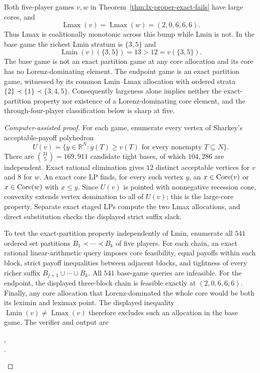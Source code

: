 \begin{proposition}
\label{prop:lx-five-large-core-separation}
Both five-player games $v,w$ in
Theorem~\ref{thm:lx-proper-exact-fails} have large cores, and
\[
 \operatorname{Lmax}(v)=\operatorname{Lmax}(w)=(2,0,6,6,6).
\]
Thus Lmax is coalitionally monotonic across this bump while Lmin is not.  In
the base game the richest Lmin stratum is $\{3,5\}$ and
\[
 \operatorname{Lmin}(v)(\{3,5\})=13>12=v(\{3,5\}).
\]
The base game is not an exact partition game at any core allocation and its
core has no Lorenz-dominating element.  The endpoint game is an exact partition
game, witnessed by its common Lmin--Lmax allocation with ordered strata
$\{2\}\prec\{1\}\prec\{3,4,5\}$.  Consequently largeness alone implies
neither the exact-partition property nor existence of a Lorenz-dominating core
element, and the through-four-player classification below is sharp at five.
\end{proposition}

\begin{proof}[Computer-assisted proof]
For each game, enumerate every vertex of Sharkey's acceptable-payoff
polyhedron
\[
 U(v)=\{y\in\mathbb R^N:y(T)\geq v(T)\text{ for every nonempty }T\subseteq N\}.
\]
There are $\binom{31}{5}=169{,}911$ candidate tight bases, of which $104{,}286$
are independent.  Exact rational elimination gives $12$ distinct acceptable
vertices for $v$ and $8$ for $w$.  An exact core LP finds, for every such
vertex $y$, an $x\in\operatorname{Core}(v)$ or $x\in\operatorname{Core}(w)$ with $x\leq y$.
Since $U(v)$ is pointed with nonnegative recession cone, convexity extends
vertex domination to all of $U(v)$; this is the large-core property.  Separate
exact staged LPs compute the two Lmax allocations, and direct substitution
checks the displayed strict suffix slack.

To test the exact-partition property independently of Lmin, enumerate all
$541$ ordered set partitions $B_1\prec\cdots\prec B_k$ of five players.  For
each chain, an exact rational linear-arithmetic query imposes core feasibility,
equal payoffs within each block, strict payoff inequalities between adjacent
blocks, and tightness of every richer suffix
$B_{j+1}\cup\cdots\cup B_k$.  All $541$ base-game queries are infeasible.  For
the endpoint, the displayed three-block chain is feasible exactly at
$(2,0,6,6,6)$.  Finally, any core allocation that Lorenz-dominated the whole
core would be both its leximin and leximax point.  The displayed inequality
$\operatorname{Lmin}(v)\ne\operatorname{Lmax}(v)$ therefore excludes such an
allocation in the base game.  The verifier and output are
\begin{center}
\small{},\\[-2pt]
\small{}.
\end{center}
\end{proof}

